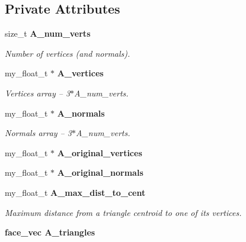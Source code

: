 \subsection*{Private Attributes}
\begin{CompactItemize}
\item 
size\_\-t \bf{A\_\-num\_\-verts}\label{classSimSite3D_1_1geometry_1_1SimpleTrimeshTwo_a490f1dccbf7067fcdc19db0f6501cc2}

\begin{CompactList}\small\item\em Number of vertices (and normals). \item\end{CompactList}\item 
my\_\-float\_\-t $\ast$ \bf{A\_\-vertices}\label{classSimSite3D_1_1geometry_1_1SimpleTrimeshTwo_5392ac1e8187163453ee7747239595bb}

\begin{CompactList}\small\item\em Vertices array -- 3$\ast$A\_\-num\_\-verts. \item\end{CompactList}\item 
my\_\-float\_\-t $\ast$ \bf{A\_\-normals}\label{classSimSite3D_1_1geometry_1_1SimpleTrimeshTwo_114534e67258df0c622185754cc4c68a}

\begin{CompactList}\small\item\em Normals array -- 3$\ast$A\_\-num\_\-verts. \item\end{CompactList}\item 
my\_\-float\_\-t $\ast$ \textbf{A\_\-original\_\-vertices}\label{classSimSite3D_1_1geometry_1_1SimpleTrimeshTwo_52aed34d252b1f014b4e35b465dc1390}

\item 
my\_\-float\_\-t $\ast$ \textbf{A\_\-original\_\-normals}\label{classSimSite3D_1_1geometry_1_1SimpleTrimeshTwo_a9e5923eab5e801a941a3babc6e1dbce}

\item 
my\_\-float\_\-t \bf{A\_\-max\_\-dist\_\-to\_\-cent}\label{classSimSite3D_1_1geometry_1_1SimpleTrimeshTwo_8aa0b21c34497bc3cefd99416dcaf28b}

\begin{CompactList}\small\item\em Maximum distance from a triangle centroid to one of its vertices. \item\end{CompactList}\item 
\bf{face\_\-vec} \bf{A\_\-triangles}\label{classSimSite3D_1_1geometry_1_1SimpleTrimeshTwo_b820c45884fc49cf977b91b04435acb2}


\end{CompactItemize}
